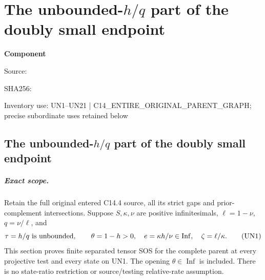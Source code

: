 \chapter{The unbounded-$h/q$ part of the doubly small endpoint}
\label{component:peaa56c1a3c7a}
\noindent\textbf{Component }\par
{\small\noindent Source: \par}
{\small\noindent SHA256: \par}
{\small\noindent Inventory use: UN1--UN21 | C14\_\allowbreak{}ENTIRE\_\allowbreak{}ORIGINAL\_\allowbreak{}PARENT\_\allowbreak{}GRAPH; precise subordinate uses retained below\par}
\medskip
\section{The unbounded-$h/q$ part of the doubly small endpoint}
\label{peaa56c1a3c7a:sec:new-c144-unbounded-h-ratio}

\paragraph{Exact scope.}
Retain the full original entered C14.4 source, all its strict gaps and
prior-complement intersections. Suppose $S,\kappa,\nu$ are positive
infinitesimals, $\ell=1-\nu$, $q=\nu/\ell$, and
\[
 \tau=h/q\ \hbox{is unbounded},\qquad
 \theta=1-h>0,\quad e=\kappa h/\nu\in\operatorname{Inf},\quad
 \zeta=\ell/\kappa.
 \tag{UN1}
\]
This section proves finite separated tensor SOS for the complete
parent at every projective test and every state on UN1. The opening
$\theta\in\operatorname{Inf}$ is included. There is no state-ratio
restriction or source/testing relative-rate assumption.

